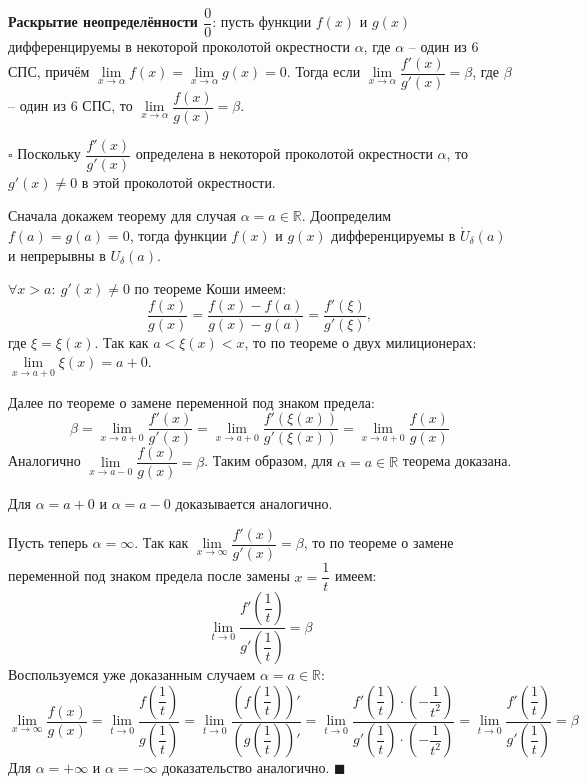 \documentclass[12pt, a4paper, reqno]{article}
\begin{document}
    \textbf{Раскрытие неопределённости $\dfrac{0}{0}$}: пусть функции $f(x)$ и $g(x)$ дифференцируемы
    в некоторой проколотой окрестности $\alpha$, где $\alpha$ -- один из 6 СПС, причём
    $\lim\limits_{x\to\alpha} f(x) = \lim\limits_{x\to\alpha} g(x) = 0$. Тогда если
    $\lim\limits_{x\to\alpha} \dfrac{f'(x)}{g'(x)} = \beta$, где $\beta$ -- один из 6 СПС, то
    $\lim\limits_{x\to\alpha} \dfrac{f(x)}{g(x)} = \beta$.

    $\square$ Поскольку $\dfrac{f'(x)}{g'(x)}$ определена в некоторой проколотой окрестности $\alpha$,
    то $g'(x)\neq 0$ в этой проколотой окрестности.

    Сначала докажем теорему для случая $\alpha = a\in\mathbb{R}$. Доопределим $f(a) = g(a) = 0$,
    тогда функции $f(x)$ и  $g(x)$ дифференцируемы в $\mathring U_{\delta}(a)$ и непрерывны в
    $U_{\delta}(a)$.

    $\forall x > a:\ g'(x)\neq 0$ по теореме Коши имеем:
    \begin{equation*}
        \dfrac{f(x)}{g(x)} = \dfrac{f(x) - f(a)}{g(x) - g(a)} = \dfrac{f'(\xi)}{g'(\xi)},
    \end{equation*}
    где $\xi = \xi(x)$. Так как $a < \xi(x) < x$, то по теореме о двух милиционерах:
    $\lim\limits_{x\to a + 0} \xi(x) = a + 0$.

    Далее по теореме о замене переменной под знаком предела:
    \begin{equation*}
        \beta = \lim\limits_{x\to a + 0} \dfrac{f'(x)}{g'(x)} =
        \lim\limits_{x\to a + 0} \dfrac{f'(\xi(x))}{g'(\xi(x))} =
        \lim\limits_{x\to a + 0} \dfrac{f(x)}{g(x)}
    \end{equation*}
    Аналогично $\lim\limits_{x\to a - 0} \dfrac{f(x)}{g(x)} = \beta$. Таким образом, для
    $\alpha = a\in\mathbb{R}$ теорема доказана.

    Для $\alpha = a + 0$ и $\alpha = a - 0$ доказывается аналогично.

    Пусть теперь $\alpha = \infty$. Так как $\lim\limits_{x\to\infty} \dfrac{f'(x)}{g'(x)} = \beta$,
    то по теореме о замене переменной под знаком предела после замены $x = \dfrac{1}{t}$ имеем:
    \begin{equation*}
        \lim\limits_{t\to 0} \dfrac{f'\left(\dfrac{1}{t}\right)}{g'\left(\dfrac{1}{t}\right)} = \beta
    \end{equation*}
    Воспользуемся уже доказанным случаем $\alpha = a\in\mathbb{R}$:
    \begin{equation*}
        \lim\limits_{x\to\infty}\dfrac{f(x)}{g(x)} =
        \lim\limits_{t\to 0} \dfrac{f\left(\dfrac{1}{t}\right)}{g\left(\dfrac{1}{t}\right)} =
        \lim\limits_{t\to 0} \dfrac{\left(f\left(\dfrac{1}{t}\right)\right)'}
                                   {\left(g\left(\dfrac{1}{t}\right)\right)'} =
        \lim\limits_{t\to 0}\dfrac{f'\left(\dfrac{1}{t}\right)\cdot\left(-\dfrac{1}{t^2}\right)}
                                  {g'\left(\dfrac{1}{t}\right)\cdot\left(-\dfrac{1}{t^2}\right)} =
        \lim\limits_{t\to 0} \dfrac{f'\left(\dfrac{1}{t}\right)}{g'\left(\dfrac{1}{t}\right)} =
        \beta
    \end{equation*}
    Для $\alpha = +\infty$ и $\alpha = -\infty$ доказательство аналогично. $\blacksquare$
\end{document}
